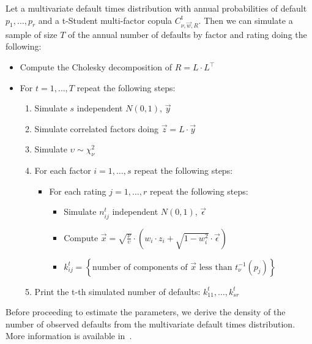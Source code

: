 \documentclass[11pt,fleqn]{book} %
\begin{document}
\begin{algorithm}
	\label{alg:snod}
	Let a multivariate default times distribution with annual probabilities 
	of default $p_1,\dots,p_r$ and a t-Student multi-factor copula 
	$C_{\nu,\vec{w},R}^{\text{t}}$. Then we can simulate a sample of size $T$ 
	of the annual number of defaults by factor and rating doing the following:
	\begin{itemize}
		\item Compute the Cholesky decomposition of $R = L \cdot L^\intercal$
		\item For $t=1,\dots,T$ repeat the following steps:
		\begin{enumerate}
			\item Simulate $s$ independent $N(0,1)$, $\vec{y}$
			\item Simulate correlated factors doing $\vec{z} = L \cdot \vec{y}$
			\item Simulate $\upsilon \sim \chi_{\nu}^2$
			\item For each factor $i=1,\dots,s$ repeat the following steps:
			\begin{itemize}
				\item For each rating $j=1,\dots,r$ repeat the following steps:
				\begin{itemize}
					\item Simulate $n_{ij}^t$ independent $N(0,1)$, $\vec{\epsilon}$
					\item Compute $\vec{x} = \sqrt{\frac{\nu}{\upsilon}} \cdot \left( w_i \cdot z_i + \sqrt{1-w_i^2} \cdot \vec{\epsilon} \right)$
					\item $k_{ij}^t = \left\{ \text{number of components of $\vec{x}$ less than $t_{\nu}^{-1}(p_j)$} \right\} $
				\end{itemize}
			\end{itemize}
			\item Print the t-th simulated number of defaults: $k_{11}^t,\dots,k_{sr}^t$
		\end{enumerate}
	\end{itemize}
\end{algorithm}

Before proceeding to estimate the parameters, we derive the density of the 
number of observed defaults from the multivariate default times distribution. 
More information is available in~\cite{schonbucher:2000,gordy:2002,roncalli:2004}.
\end{document}
